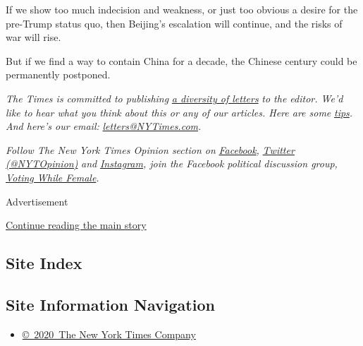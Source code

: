 If we show too much indecision and weakness, or just too obvious a
desire for the pre-Trump status quo, then Beijing's escalation will
continue, and the risks of war will rise.

But if we find a way to contain China for a decade, the Chinese century
could be permanently postponed.

\emph{The Times is committed to publishing}
\href{https://www.nytimes3xbfgragh.onion/2019/01/31/opinion/letters/letters-to-editor-new-york-times-women.html}{\emph{a
diversity of letters}} \emph{to the editor. We'd like to hear what you
think about this or any of our articles. Here are some}
\href{https://help.nytimes3xbfgragh.onion/hc/en-us/articles/115014925288-How-to-submit-a-letter-to-the-editor}{\emph{tips}}\emph{.
And here's our email:}
\href{mailto:letters@NYTimes.com}{\emph{letters@NYTimes.com}}\emph{.}

\emph{Follow The New York Times Opinion section on}
\href{https://www.facebookcorewwwi.onion/nytopinion}{\emph{Facebook}}\emph{,}
\href{http://twitter.com/NYTOpinion}{\emph{Twitter (@NYTOpinion)}}
\emph{and}
\href{https://www.instagram.com/nytopinion/}{\emph{Instagram}}\emph{,
join the Facebook political discussion group,}
\href{https://www.facebookcorewwwi.onion/groups/votingwhilefemale/}{\emph{Voting
While Female}}\emph{.}

Advertisement

\protect\hyperlink{after-bottom}{Continue reading the main story}

\hypertarget{site-index}{%
\subsection{Site Index}\label{site-index}}

\hypertarget{site-information-navigation}{%
\subsection{Site Information
Navigation}\label{site-information-navigation}}

\begin{itemize}
\tightlist
\item
  \href{https://help.nytimes3xbfgragh.onion/hc/en-us/articles/115014792127-Copyright-notice}{©~2020~The
  New York Times Company}
\end{itemize}

